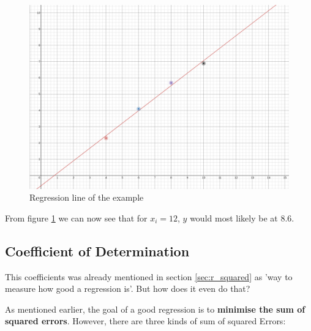 \documentclass[11pt]{article}
\begin{document}
\begin{figure}[htb!]
    \centering
    \includegraphics[keepaspectratio=true, width=\linewidth]{regression_line.png}
    \caption{Regression line of the example}
    \label{fig:regression_line}
\end{figure}

From figure \ref{fig:regression_line} we can now see that for $x_{i}=12$, $y$ would most likely be at $8.6$.

\subsection{Coefficient of Determination}

This coefficients was already mentioned in section \ref{sec:r_squared} as 'way to measure how good a regression is'. But how does it even do that?

As mentioned earlier, the goal of a good regression is to \textbf{minimise the sum of squared errors}. However, there are three kinds of sum of squared Errors:

\vspace{10px}
\end{document}
